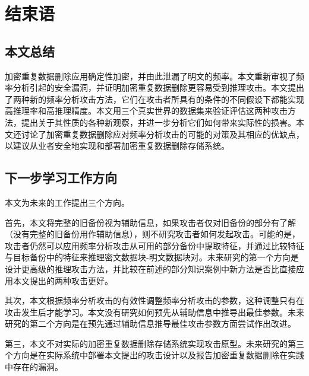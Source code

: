 \chapter{结束语}
\label{sec:Conclusion}

\section{本文总结}

加密重复数据删除应用确定性加密，并由此泄漏了明文的频率。本文重新审视了频率分析引起的安全漏洞，并证明加密重复数据删除更容易受到推理攻击。本文提出了两种新的频率分析攻击方法，它们在攻击者所具有的条件的不同假设下都能实现高推理率和高推理精度。本文用三个真实世界的数据集来验证评估这两种攻击方法，提出关于其性质的各种新观察，并进一步分析它们如何带来实际性的损害。本文还讨论了加密重复数据删除应对频率分析攻击的可能的对策及其相应的优缺点，以建议从业者安全地实现和部署加密重复数据删除存储系统。
     
\section{下一步学习工作方向}

本文为未来的工作提出三个方向。


首先，本文将完整的旧备份视为辅助信息，如果攻击者仅对旧备份的部分有了解（没有完整的旧备份用作辅助信息），则不研究攻击者如何发起攻击。可能的是，攻击者仍然可以应用频率分析攻击从可用的部分备份中提取特征，并通过比较特征与目标备份中的特征来推理密文数据块-明文数据块对。未来研究的第一个方向是设计更高级的推理攻击方法，并比较在前述的部分知识案例中新方法是否比直接应用本文提出的两种攻击更好。
      
      
\par 其次，本文根据频率分析攻击的有效性调整频率分析攻击的参数，这种调整只有在攻击发生后才能学习。本文没有研究如何预先从辅助信息中推导出最佳参数。未来研究的第二个方向是在预先通过辅助信息推导最佳攻击参数方面尝试作出改进。
 


第三，本文不对实际的加密重复数据删除存储系统实现攻击原型。未来研究的第三个方向是在实际系统中部署本文提出的攻击设计以及报告加密重复数据删除在实践中存在的漏洞。


